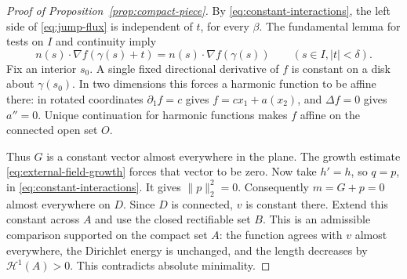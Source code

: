\begin{proof}[Proof of Proposition~\ref{prop:compact-piece}]
By \eqref{eq:constant-interactions}, the left side of
\eqref{eq:jump-flux} is independent of $t$, for every $\beta$.
The fundamental lemma for tests on $I$ and continuity imply
\[
 n(s)\cdot\nabla f(\gamma(s)+t)
      =n(s)\cdot\nabla f(\gamma(s))
       \qquad(s\in I, |t|<\delta).
\]
Fix an interior $s_0$. A single fixed directional derivative of $f$
is constant on a disk about $\gamma(s_0)$. In two dimensions this
forces a harmonic function to be affine there: in rotated coordinates
$\partial_1 f=c$ gives $f=cx_1+a(x_2)$, and $\Delta f=0$ gives
$a''=0$. Unique continuation for harmonic functions makes $f$ affine
on the connected open set $O$.

Thus $G$ is a constant vector almost everywhere in the plane.
The growth estimate \eqref{eq:external-field-growth} forces that vector
to be zero. Now take $h'=h$, so $q=p$, in
\eqref{eq:constant-interactions}. It gives $\|p\|_2^2=0$.
Consequently $m=G+p=0$ almost everywhere on $D$. Since $D$ is connected,
$v$ is constant there. Extend this constant across $A$ and use the closed rectifiable set
$B$. This is an admissible comparison supported on the compact set $A$:
the function agrees with $v$ almost everywhere, the Dirichlet energy
is unchanged, and the length decreases by $\mathcal H^1(A)>0$.
This contradicts absolute minimality.
\end{proof}
